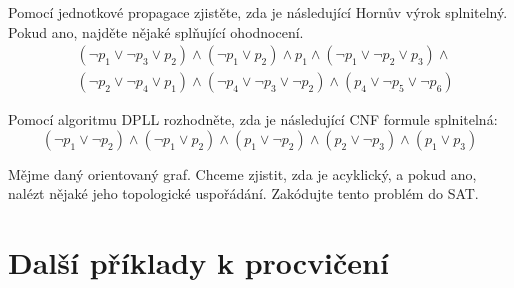 \begin{problem}

    Pomocí jednotkové propagace zjistěte, zda je následující Hornův výrok splnitelný. Pokud ano, najděte nějaké splňující ohodnocení.
    \begin{align*}
        &(\neg p_1 \vee \neg p_3 \vee p_2)\wedge(\neg p_1 \vee p_2)\wedge p_1 \wedge (\neg p_1 \vee \neg p_2 \vee p_3)\wedge \\
        &(\neg p_2 \vee \neg p_4 \vee p_1)\wedge(\neg p_4 \vee \neg p_3 \vee \neg p_2)\wedge(p_4\vee \neg p_5 \vee\neg p_6)
    \end{align*}

    \begin{solution}
                
    \end{solution}
    
\end{problem}


\begin{problem} \label{problem:dpll}

    Pomocí algoritmu DPLL rozhodněte, zda je následující CNF formule splnitelná:
    $$ 
    (\neg p_1 \lor \neg p_2)\land( \neg p_1 \lor p_2)\land( p_1 \lor \neg p_2)\land( p_2 \lor \neg p_3)\land( p_1 \lor p_3)
    $$

    \begin{solution}
                
    \end{solution}

\end{problem}


\begin{problem}

    Mějme daný orientovaný graf. Chceme zjistit, zda je acyklický, a pokud ano, nalézt nějaké jeho topologické uspořádání. Zakódujte tento problém do SAT.

\end{problem}
    
    
\section*{Další příklady k procvičení}
    

